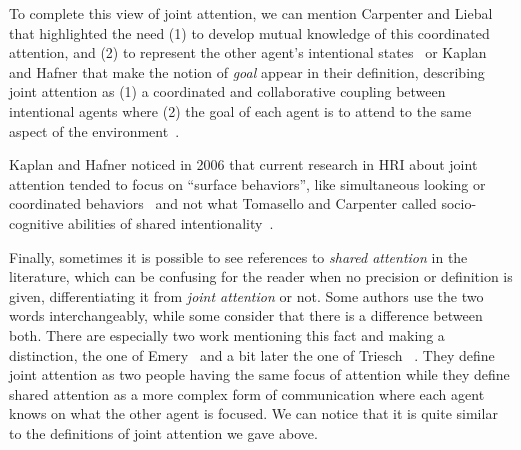 \documentclass[a4paper,11pt,twoside]{StyleThese}
\begin{document}
To complete this view of joint attention, we can mention Carpenter and Liebal that highlighted the need (1) to develop mutual knowledge of this coordinated attention, and (2) to represent the other agent’s intentional states~\cite{carpenter_2011_joint} or Kaplan and Hafner that make the notion of \emph{goal} appear in their definition, describing joint attention as (1) a coordinated and collaborative coupling between intentional agents where (2) the goal of each agent is to attend to the same aspect of the environment~\cite{kaplan_2006_challenges}.

Kaplan and Hafner noticed in 2006 that current research in HRI about joint attention tended to focus on ``surface behaviors'', like simultaneous looking or coordinated behaviors~\cite{kaplan_2006_challenges} and not what Tomasello and Carpenter called socio-cognitive abilities of shared intentionality~\cite{tomasello_2007_shared}.

Finally, sometimes it is possible to see references to \emph{shared attention} in the literature, which can be confusing for the reader when no precision or definition is given, differentiating it from \emph{joint attention} or not. Some authors use the two words interchangeably, while some consider that there is a difference between both. There are especially two work mentioning this fact and making a distinction, the one of Emery~\cite{emery_2000_eyes} and a bit later the one of Triesch \etal~\cite{triesch_2006_gaze}. They define joint attention as two people having the same focus of attention while they define shared attention as a more complex form of communication where each agent knows on what the other agent is focused. We can notice that it is quite similar to the definitions of joint attention we gave above.
\end{document}

